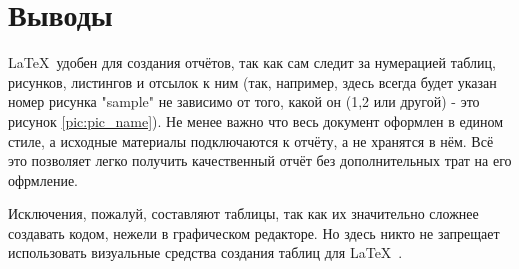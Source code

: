 \section*{Выводы}
\LaTeX\ удобен для создания отчётов, так как сам следит за нумерацией таблиц, рисунков, листингов и отсылок к ним (так, например, здесь всегда будет указан номер рисунка "sample" не зависимо от того, какой он (1,2 или другой) - это рисунок \ref{pic:pic_name}). Не менее важно что весь документ оформлен в едином стиле, а исходные материалы подключаются к отчёту, а не хранятся в нём. Всё это позволяет легко получить качественный отчёт без дополнительных трат на его офрмление.

Исключения, пожалуй, составляют таблицы, так как их значительно сложнее создавать кодом, нежели в графическом редакторе. Но здесь никто не запрещает использовать визуальные средства создания таблиц для \LaTeX\ .

